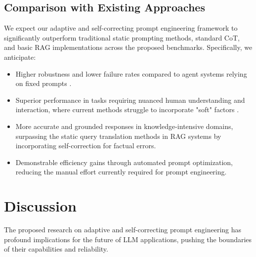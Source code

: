 \documentclass{article}
\begin{document}
\subsection{Comparison with Existing Approaches}
We expect our adaptive and self-correcting prompt engineering framework to significantly outperform traditional static prompting methods, standard CoT, and basic RAG implementations across the proposed benchmarks. Specifically, we anticipate:
\begin{itemize}
    \item Higher robustness and lower failure rates compared to agent systems relying on fixed prompts \cite{paper1_agents}.
    \item Superior performance in tasks requiring nuanced human understanding and interaction, where current methods struggle to incorporate "soft" factors \cite{paper2_requirements}.
    \item More accurate and grounded responses in knowledge-intensive domains, surpassing the static query translation methods in RAG systems \cite{paper5_legalrag} by incorporating self-correction for factual errors.
    \item Demonstrable efficiency gains through automated prompt optimization, reducing the manual effort currently required for prompt engineering.
\end{itemize}

\section{Discussion}
The proposed research on adaptive and self-correcting prompt engineering has profound implications for the future of LLM applications, pushing the boundaries of their capabilities and reliability.
\end{document}
